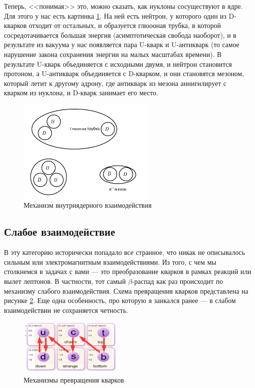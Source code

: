 \documentclass[12pt]{article}
\begin{document}
\noindent
Теперь, <<понимая>> это, можно сказать, как нуклоны сосуществуют в ядре. Для этого у нас есть картинка \ref{fig:sem_11_nuclei}. На ней есть нейтрон, у которого один из D-кварков отходит от остальных, и образуется глюооная трубка, в которой сосредотачивается большая энергия (асимптотическая свобода наоборот), и в результате из вакуума у нас появляется пара U-кварк и U-антикварк (то самое нарушение закона сохранения энергии на малых масштабах времени). В результате U-кварк объединяется с исходными двумя, и нейтрон становится протоном, а U-антикварк объединяется с D-кварком, и они становятся мезоном, который летит к другому адрону, где антикварк из мезона аннигилирует с кварком из нуклона, и D-кварк занимает его место.

\begin{figure}[h!]
    \centering
    \includegraphics[width=0.6\textwidth,height=\textheight,keepaspectratio]{Seminar_11-12/pics/pic_03_nuclei.pdf}
    \caption{Механизм внутриядерного взаимодействия}
    \label{fig:sem_11_nuclei}
\end{figure}

\subsection{Слабое взаимодействие}
В эту категорию исторически попадало все странное, что никак не описывалось сильным или электромагнитным взаимодействиями. Из того, с чем мы столкнемся в задачах с вами --- это преобразование кварков в рамках реакций или вылет лептонов. В частности, тот самый $\beta$-распад как раз происходит по механизму слабого взаимодействия. Схема превращения кварков представлена на рисунке \ref{fig:sem_11_weak}. Еще одна особенность, про которую я заикался ранее --- в слабом взаимодействии не сохраняется четность. 
\begin{figure}[h]
    \centering
    \includegraphics[width=0.45\textwidth,keepaspectratio]{Seminar_11-12/pics/pic_04_weak.PNG}
    \caption{Механизмы превращения кварков}
    \label{fig:sem_11_weak}
\end{figure}
\end{document}
